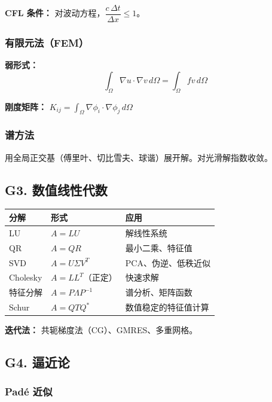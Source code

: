 \textbf{CFL 条件：} 对波动方程，$\dfrac{c\,\Delta t}{\Delta x} \leq 1$。

\subsubsection{有限元法（FEM）}

\textbf{弱形式：}
\[
\int_\Omega \nabla u \cdot \nabla v\,d\Omega = \int_\Omega fv\,d\Omega
\]

\textbf{刚度矩阵：} $K_{ij} = \displaystyle\int_\Omega \nabla\phi_i \cdot \nabla\phi_j\,d\Omega$

\subsubsection{谱方法}

用全局正交基（傅里叶、切比雪夫、球谐）展开解。对光滑解指数收敛。

\subsection{G3. 数值线性代数}

\begin{center}
\begin{tabular}{lll}
\toprule
\textbf{分解} & \textbf{形式} & \textbf{应用} \\
\midrule
LU & $A = LU$ & 解线性系统 \\
QR & $A = QR$ & 最小二乘、特征值 \\
SVD & $A = U\Sigma V^T$ & PCA、伪逆、低秩近似 \\
Cholesky & $A = LL^T$（正定） & 快速求解 \\
特征分解 & $A = P\Lambda P^{-1}$ & 谱分析、矩阵函数 \\
Schur & $A = QTQ^*$ & 数值稳定的特征值计算 \\
\bottomrule
\end{tabular}
\end{center}

\textbf{迭代法：} 共轭梯度法（CG）、GMRES、多重网格。

\subsection{G4. 逼近论}

\subsubsection{Padé 近似}

